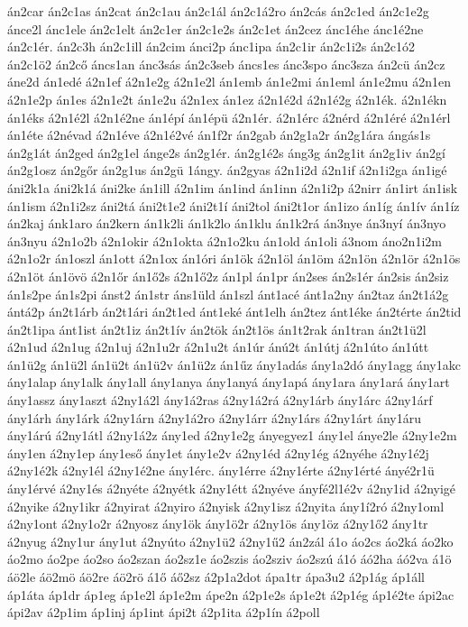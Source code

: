 {án2car
án2c1as
án2cat
án2c1au
án2c1ál
án2c1á2ro
án2cás
án2c1ed
án2c1e2g
ánce2l
ánc1ele
án2c1elt
án2c1er
án2c1e2s
án2c1et
án2cez
ánc1éhe
ánc1é2ne
án2c1ér.
án2c3h
án2c1ill
án2cim
ánci2p
ánc1ipa
án2c1ir
án2c1i2s
án2c1ó2
án2c1ö2
án2cő
áncs1an
ánc3sás
án2c3seb
áncs1es
ánc3spo
ánc3sza
án2cü
án2cz
áne2d
án1edé
á2n1ef
á2n1e2g
á2n1e2l
án1emb
án1e2mi
án1eml
án1e2mu
á2n1en
á2n1e2p
án1es
á2n1e2t
án1e2u
á2n1ex
án1ez
á2n1é2d
á2n1é2g
á2n1ék.
á2n1ékn
án1éks
á2n1é2l
á2n1é2ne
án1épí
án1épü
á2n1ér.
á2n1érc
á2nérd
á2n1éré
á2n1érl
án1éte
á2névad
á2n1éve
á2n1é2vé
án1f2r
án2gab
án2g1a2r
án2g1ára
ángás1s
án2g1át
án2ged
án2g1el
ánge2s
án2g1ér.
án2g1é2s
áng3g
án2g1it
án2g1iv
án2gí
án2g1osz
án2gőr
án2g1us
án2gü
1ángy.
án2gyas
á2n1i2d
á2n1if
á2n1i2ga
án1igé
áni2k1a
áni2k1á
áni2ke
án1ill
á2n1im
án1ind
án1inn
á2n1i2p
á2nirr
án1irt
án1isk
án1ism
á2n1i2sz
áni2tá
áni2t1e2
áni2t1í
áni2tol
áni2t1or
án1izo
án1íg
án1ív
án1íz
án2kaj
ánk1aro
án2kern
án1k2li
án1k2lo
án1klu
án1k2rá
án3nye
án3nyí
án3nyo
án3nyu
á2n1o2b
á2n1okir
á2n1okta
á2n1o2ku
án1old
án1oli
á3nom
áno2n1i2m
á2n1o2r
án1oszl
án1ott
á2n1ox
án1óri
án1ök
á2n1öl
án1öm
á2n1ön
á2n1ör
á2n1ös
á2n1öt
án1övö
á2n1őr
án1ő2s
á2n1ő2z
án1pl
án1pr
án2ses
án2s1ér
án2sis
án2siz
án1s2pe
án1s2pi
ánst2
án1str
áns1üld
án1szl
ánt1acé
ánt1a2ny
án2taz
án2t1á2g
ántá2p
án2t1árb
án2t1ári
án2t1ed
ánt1eké
ánt1elh
án2tez
ánt1éke
án2térte
án2tid
án2t1ipa
ánt1ist
án2t1iz
án2t1ív
án2tök
án2t1ös
án1t2rak
án1tran
án2t1ü2l
á2n1ud
á2n1ug
á2n1uj
á2n1u2r
á2n1u2t
án1úr
ánú2t
án1útj
á2n1úto
án1útt
án1ü2g
án1ü2l
án1ü2t
án1ü2v
án1ü2z
án1űz
ány1adás
ány1a2dó
ány1agg
ány1akc
ány1alap
ány1alk
ány1all
ány1anya
ány1anyá
ány1apá
ány1ara
ány1ará
ány1art
ány1assz
ány1aszt
á2ny1á2l
ány1á2ras
á2ny1á2rá
á2ny1árb
ány1árc
á2ny1árf
ány1árh
ány1árk
á2ny1árn
á2ny1á2ro
á2ny1árr
á2ny1árs
á2ny1árt
ány1áru
ány1árú
á2ny1átl
á2ny1á2z
ány1ed
á2ny1e2g
ányegyez1
ány1el
ánye2le
á2ny1e2m
ány1en
á2ny1ep
ány1eső
ány1et
ány1e2v
á2ny1éd
á2ny1ég
á2nyéhe
á2ny1é2j
á2ny1é2k
á2ny1él
á2ny1é2ne
ány1érc.
ány1érre
á2ny1érte
á2ny1érté
ányé2r1ü
ány1érvé
á2ny1és
á2nyéte
á2nyétk
á2ny1étt
á2nyéve
ányfé2l1é2v
á2ny1id
á2nyigé
á2nyike
á2ny1ikr
á2nyirat
á2nyiro
á2nyisk
á2ny1isz
á2nyita
ány1í2ró
á2ny1oml
á2ny1ont
á2ny1o2r
á2nyosz
ány1ök
ány1ö2r
á2ny1ös
ány1öz
á2ny1ő2
ány1tr
á2nyug
á2ny1ur
ány1ut
á2nyúto
á2ny1ü2
á2ny1ű2
án2zál
á1o
áo2cs
áo2ká
áo2ko
áo2mo
áo2pe
áo2so
áo2szan
áo2sz1e
áo2szis
áo2sziv
áo2szú
á1ó
áó2ha
áó2va
á1ö
áö2le
áö2mö
áö2re
áö2rö
á1ő
áő2sz
á2p1a2dot
ápa1tr
ápa3u2
á2p1ág
áp1áll
áp1áta
áp1dr
áp1eg
áp1e2l
áp1e2m
ápe2n
á2p1e2s
áp1e2t
á2p1ég
áp1é2te
ápi2ac
ápi2av
á2p1im
áp1inj
áp1int
ápi2t
á2p1ita
á2p1ín
á2poll
}
